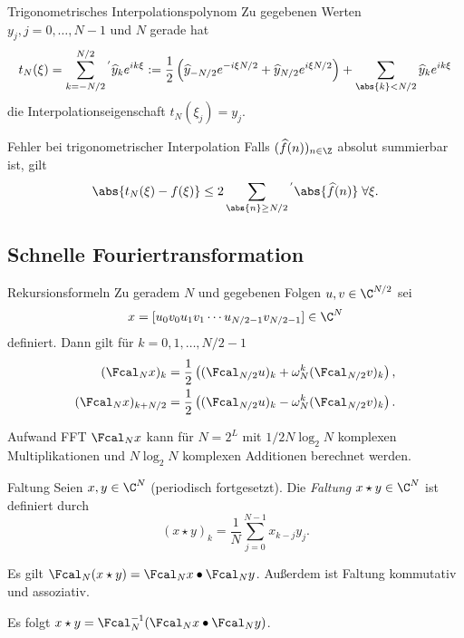 \begin{karte}{Trigonometrisches Interpolationspolynom}
    Zu gegebenen Werten \(y_j, j=0,\ldots, N-1\) und \(N\) gerade hat 
    \[ t_N(\xi) = \sum_{k=-N/2}^{N/2}{}^{'} \widehat{y}_k e^{ik\xi} 
    := \frac{1}{2} \left( \widehat{y}_{-N/2} e^{-i\xi N/2} + \widehat{y}_{N/2} e^{i\xi N/2} \right) 
    + \sum_{\abs{k} < N/2} \widehat{y}_k e^{ik\xi} \]
    die Interpolationseigenschaft \(t_N(\xi_j) = y_j\).
\end{karte}

\begin{karte}{Fehler bei trigonometrischer Interpolation}
    Falls \( (\widehat{f}(n))_{n\in\Z} \) absolut summierbar ist, gilt 
    \[ \abs{t_N(\xi) - f(\xi)} \leq 2 \sum_{\abs{n}\geq N/2}{}^{'} \abs{\widehat{f}(n)} \;\forall \xi. \]
\end{karte}

\subsection{Schnelle Fouriertransformation}

\begin{karte}{Rekursionsformeln}
    Zu geradem \(N\) und gegebenen Folgen \(u,v\in\C^{N/2}\) sei 
    \[ x = [u_0 v_0 u_1 v_1 \cdots u_{N/2-1} v_{N/2-1}] \in \C^N \]
    definiert. Dann gilt für \(k=0,1,\ldots, N/2-1\)
    \begin{align*}
        (\Fcal_N x)_k &= \frac{1}{2} \left( (\Fcal_{N/2} u)_k + \omega_N^k (\Fcal_{N/2} v)_k \right), \\
        (\Fcal_N x)_{k+N/2} &= \frac{1}{2} \left( (\Fcal_{N/2} u)_k - \omega_N^k (\Fcal_{N/2} v)_k \right).
    \end{align*}
\end{karte}

\begin{karte}{Aufwand FFT}
    \(\Fcal_N x\) kann für \(N=2^L\) mit \(1/2 N\log_2N\) komplexen Multiplikationen und \(N \log_2N\) 
    komplexen Additionen berechnet werden.
\end{karte}

\begin{karte}{Faltung}
    Seien \(x,y\in \C^N\) (periodisch fortgesetzt). Die \textit{Faltung} \(x\star y \in \C^N\) ist definiert 
    durch 
    \[ (x \star y)_k = \frac{1}{N} \sum_{j=0}^{N-1} x_{k-j} y_j. \]

    Es gilt \(\Fcal_N(x\star y) = \Fcal_N x \bullet \Fcal_N y\).
    Außerdem ist Faltung kommutativ und assoziativ.

    Es folgt \( x\star y = \Fcal_N^{-1}(\Fcal_N x \bullet \Fcal_N y) \).
\end{karte}

